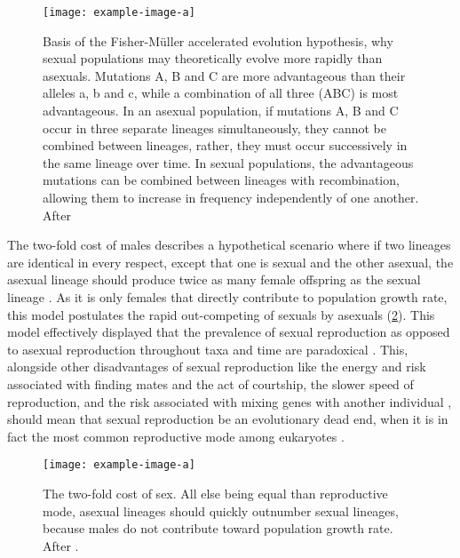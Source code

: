 \begin{figure}
\centering
{\texttt{[image: example-image-a]}}
\caption[Basis of the Fisher-M\"uller accelerated evolution hypothesis]{Basis of the Fisher-M\"uller accelerated evolution hypothesis, why sexual populations may theoretically evolve more rapidly than asexuals. Mutations A, B and C are more advantageous than their alleles a, b and c, while a combination of all three (ABC) is most advantageous. In an asexual population, if mutations A, B and C occur in three separate lineages simultaneously, they cannot be combined between lineages, rather, they must occur successively in the same lineage over time. In sexual populations, the advantageous mutations can be combined between lineages with recombination, allowing them to increase in frequency independently of one another. After \textcite{maynard-smith_evolutionary_1989}}
\label{fig:introfigure3}
\end{figure}

The two-fold cost of males describes a hypothetical scenario where if two lineages are identical in every respect, except that one is sexual and the other asexual, the asexual lineage should produce twice as many female offspring as the sexual lineage \parencite{maynard-smith_origin_1971}. As it is only females that directly contribute to population growth rate, this model postulates the rapid out-competing of sexuals by asexuals (\cref{fig:introfigure1}). This model effectively displayed that the prevalence of sexual reproduction as opposed to asexual reproduction throughout taxa and time are paradoxical \parencite{williams_sex_1975}. This, alongside other disadvantages of sexual reproduction like the energy and risk associated with finding mates and the act of courtship, the slower speed of reproduction, and the risk associated with mixing genes with another individual \parencite{otto_resolving_2002}, should mean that sexual reproduction be an evolutionary dead end, when it is in fact the most common reproductive mode among eukaryotes \parencite{bell_masterpiece_1982}.

\begin{figure}
\centering
{\texttt{[image: example-image-a]}}
\caption[The two-fold cost of sex]{The two-fold cost of sex. All else being equal than reproductive mode, asexual lineages should quickly outnumber sexual lineages, because males do not contribute toward population growth rate. After \textcite{maynard-smith_origin_1971}.}
\label{fig:introfigure1}
\end{figure}

